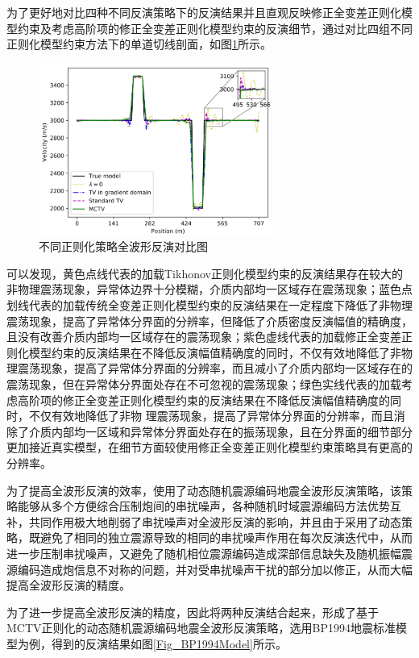 \documentclass[11pt]{article}
\begin{document}
\par
为了更好地对比四种不同反演策略下的反演结果并且直观反映修正全变差正则化模型约束及考虑高阶项的修正全变差正则化模型约束的反演细节，通过对比四组不同正则化模型约束方法下的单道切线剖面，如图\ref{Fig_CrossModelLine}所示。
\begin{figure}[htbp]
\centering
\includegraphics[width=3in]{./FigureFolder/Foundation/FWI/CrossModelLine.pdf}
\caption{不同正则化策略全波形反演对比图}
\label{Fig_CrossModelLine}
\end{figure}
\par
可以发现，黄色点线代表的加载Tikhonov正则化模型约束的反演结果存在较大的非物理震荡现象，异常体边界十分模糊，介质内部均一区域存在震荡现象；蓝色点划线代表的加载传统全变差正则化模型约束的反演结果在一定程度下降低了非物理震荡现象，提高了异常体分界面的分辨率，但降低了介质密度反演幅值的精确度，且没有改善介质内部均一区域存在的震荡现象；紫色虚线代表的加载修正全变差正则化模型约束的反演结果在不降低反演幅值精确度的同时，不仅有效地降低了非物理震荡现象，提高了异常体分界面的分辨率，而且减小了介质内部均一区域存在的震荡现象，但在异常体分界面处存在不可忽视的震荡现象；绿色实线代表的加载考虑高阶项的修正全变差正则化模型约束的反演结果在不降低反演幅值精确度的同时，不仅有效地降低了非物
理震荡现象，提高了异常体分界面的分辨率，而且消除了介质内部均一区域和异常体分界面处存在的振荡现象，且在分界面的细节部分更加接近真实模型，在细节方面较使用修正全变差正则化模型约束策略具有更高的分辨率。
\par
为了提高全波形反演的效率，使用了动态随机震源编码地震全波形反演策略，该策略能够从多个方便综合压制炮间的串扰噪声，各种随机时域震源编码方法优势互补，共同作用极大地削弱了串扰噪声对全波形反演的影响，并且由于采用了动态策略，既避免了相同的独立震源导致的相同的串扰噪声作用在每次反演迭代中，从而进一步压制串扰噪声，又避免了随机相位震源编码造成深部信息缺失及随机振幅震源编码造成炮信息不对称的问题，并对受串扰噪声干扰的部分加以修正，从而大幅提高全波形反演的精度。
\par
为了进一步提高全波形反演的精度，因此将两种反演结合起来，形成了基于MCTV正则化的动态随机震源编码地震全波形反演策略，选用BP1994地震标准模型为例，得到的反演结果如图\ref{Fig_BP1994Model}所示。
\end{document}
